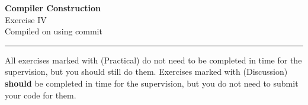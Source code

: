 \documentclass[10pt,a4paper]{exam} %
\begin{document}
	


\newcommand{\course}{Compiler Construction}
\newcommand{\week}{IV}
\newcommand{\topics}{}

\everymath{\color{campurpledark}}
\everydisplay{\color{campurpledark}}




\marksnotpoints
\pointsdroppedatright
\marksnotpoints
\marginpointname{ \points}

\immediate{}
\immediate{}

\begin{center}
\LARGE {\textbf{\color{campurpledark} \course} }\\[-0.2cm]
\Large \color{campurpledark} Exercise \week\\
{
	\footnotesize Compiled on  using commit 
}
\end{center}

{\color{campurple}\hrule}

\newcommand{\terminal}[1]{\texttt{\color{campurple}#1}}
\newcommand{\bl}[1]{{\color{black}#1}}

\vspace{0.5cm}

All exercises marked with (Practical) do not need to be completed in time for the supervision, but you should still do them. Exercises marked with (Discussion) \textbf{should} be completed in time for the supervision, but you do not need to submit your code for them.
\end{document}
